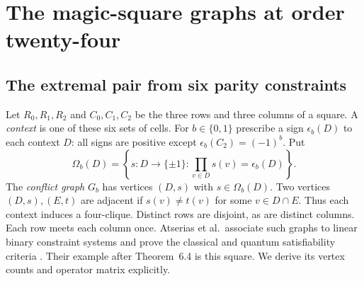 \documentclass[11pt,reqno]{amsart}
\numberwithin{equation}{section}
\theoremstyle{definition}
\begin{document}
\section{The magic-square graphs at order twenty-four}\label{sec:boundary}
\subsection{The extremal pair from six parity constraints}\label{sec:upper}
Let $R_0,R_1,R_2$ and $C_0,C_1,C_2$ be the three rows and three columns of a
square. A \emph{context} is one of these six sets of cells. For
$b\in\{0,1\}$ prescribe a sign $\epsilon_b(D)$ to each context $D$:
all signs are positive except $\epsilon_b(C_2)=(-1)^b$. Put
\[
 \Omega_b(D)=\left\{s:D\to\{\pm1\}:\prod_{v\in D}s(v)=\epsilon_b(D)\right\}.
\]
The \emph{conflict graph} $G_b$ has vertices $(D,s)$ with $s\in\Omega_b(D)$.
Two vertices $(D,s),(E,t)$ are adjacent if
$s(v)\ne t(v)$ for some $v\in D\cap E$.
Thus each context induces a four-clique. Distinct rows are disjoint, as
are distinct columns. Each row meets each column once. Atserias et al.\
associate such graphs to linear binary constraint systems and prove the
classical and quantum satisfiability criteria \cite[Thms.~6.2--6.4]{AMRSSV}.
Their example after Theorem~6.4 is this square. We derive its vertex
counts and operator matrix explicitly.
\end{document}
